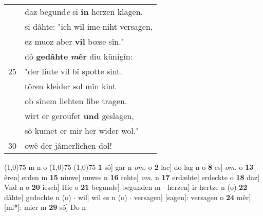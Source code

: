 \documentclass[8pt,a4paper,notitlepage]{article}
\begin{document}
\begin{table}[ht]
\begin{minipage}[t]{0.5\linewidth}
\begin{tabular}{rl}
 & daz begund\textit{e} si \textbf{in} herzen klagen.\\ 
 & si dâhte: "ich wil ime niht versagen,\\ 
 & ez muoz aber \textbf{vil} bœse sîn."\\ 
 & dô \textbf{gedâhte} \textbf{\textit{m}êr} diu künigîn:\\ 
25 & "der liute vil bî spotte sint.\\ 
 & tôren kleider sol mîn kint\\ 
 & ob sînem liehten lîbe tragen.\\ 
 & wirt er geroufet \textbf{und} geslagen,\\ 
 & sô kumet er mir her wider wol."\\ 
30 & owê der jâmerlîchen dol!\\ 
\end{tabular}
\scriptsize
\line(1,0){75} \newline
m n o \newline
\line(1,0){75} \newline
\newline
\line(1,0){75} \newline
\textbf{1} sô] gar n \textit{om.} o \textbf{2} lac] do lag n o \textbf{8} es] \textit{om.} o \textbf{13} êren] erden m \textbf{15} niuwe] nuwes n \textbf{16} rehte] \textit{om.} n \textbf{17} erdæhte] erdeckte o \textbf{18} daz] Vnd n o \textbf{20} iesch] Hie o \textbf{21} begunde] begunden m  $\cdot$ herzen] ir hertze n (o) \textbf{22} dâhte] gedochte n (o)  $\cdot$ wil] wil es n (o)  $\cdot$ versagen] [sagen]: versagen o \textbf{24} mêr] [mi*]: mier m \textbf{29} sô] Do n \newline
\end{minipage}
\end{table}
\newpage
\end{document}
